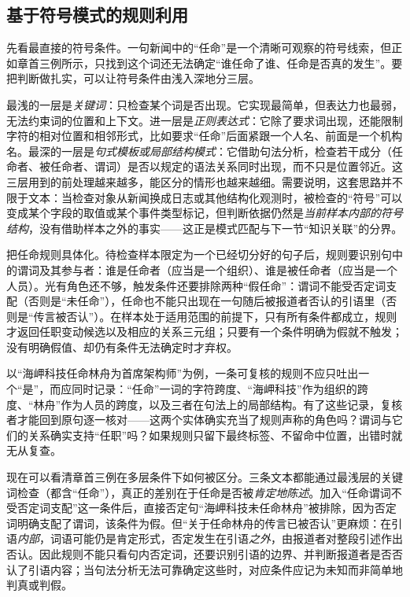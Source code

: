 \subsection{基于符号模式的规则利用}
\label{sec:rule-based-knowledge-acquisition-symbolic-pattern}

先看最直接的符号条件。一句新闻中的“任命”是一个清晰可观察的符号线索，但正如章首三例所示，只找到这个词还无法确定“谁任命了谁、任命是否真的发生”。要把判断做扎实，可以让符号条件由浅入深地分三层。

最浅的一层是\emph{关键词}：只检查某个词是否出现。它实现最简单，但表达力也最弱，无法约束词的位置和上下文。进一层是\emph{正则表达式}：它除了要求词出现，还能限制字符的相对位置和相邻形式，比如要求“任命”后面紧跟一个人名、前面是一个机构名。最深的一层是\emph{句式模板或局部结构模式}：它借助句法分析，检查若干成分（任命者、被任命者、谓词）是否以规定的语法关系同时出现，而不只是位置邻近。这三层用到的前处理越来越多，能区分的情形也越来越细。需要说明，这套思路并不限于文本：当检查对象从新闻换成日志或其他结构化观测时，被检查的“符号”可以变成某个字段的取值或某个事件类型标记，但判断依据仍然是\emph{当前样本内部的符号结构}，没有借助样本之外的事实——这正是模式匹配与下一节“知识关联”的分界。

把任命规则具体化。待检查样本限定为一个已经切分好的句子后，规则要识别句中的谓词及其参与者：谁是任命者（应当是一个组织）、谁是被任命者（应当是一个人员）。光有角色还不够，触发条件还要排除两种“假任命”：谓词不能受否定词支配（否则是“未任命”），任命也不能只出现在一句随后被报道者否认的引语里（否则是“传言被否认”）。在样本处于适用范围的前提下，只有所有条件都成立，规则才返回任职变动候选以及相应的关系三元组；只要有一个条件明确为假就不触发；没有明确假值、却仍有条件无法确定时才弃权。

以“海岬科技任命林舟为首席架构师”为例，一条可复核的规则不应只吐出一个“是”，而应同时记录：“任命”一词的字符跨度、“海岬科技”作为组织的跨度、“林舟”作为人员的跨度，以及三者在句法上的局部结构。有了这些记录，复核者才能回到原句逐一核对——这两个实体确实充当了规则声称的角色吗？谓词与它们的关系确实支持“任职”吗？如果规则只留下最终标签、不留命中位置，出错时就无从复查。

现在可以看清章首三例在多层条件下如何被区分。三条文本都能通过最浅层的关键词检查（都含“任命”），真正的差别在于任命是否被\emph{肯定地陈述}。加入“任命谓词不受否定词支配”这一条件后，直接否定句“海岬科技未任命林舟”被排除，因为否定词明确支配了谓词，该条件为假。但“关于任命林舟的传言已被否认”更麻烦：在引语\emph{内部}，词语可能仍是肯定形式，否定发生在引语\emph{之外}，由报道者对整段引述作出否认。因此规则不能只看句内否定词，还要识别引语的边界、并判断报道者是否否认了引语内容；当句法分析无法可靠确定这些时，对应条件应记为未知而非简单地判真或判假。

